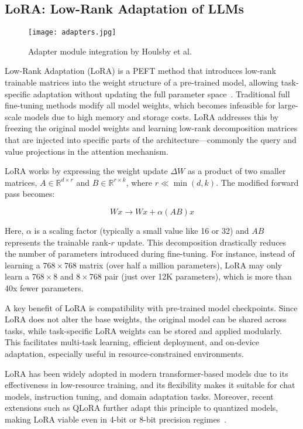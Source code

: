 \subsection{LoRA: Low-Rank Adaptation of LLMs}

\begin{figure}[t]
  \centering
  \texttt{[image: adapters.jpg]}
  \caption{Adapter module integration by Houlsby et al.~\cite{houlsby2019parameter}}
\end{figure}

Low-Rank Adaptation (LoRA) is a PEFT method that introduces low-rank trainable
matrices into the weight structure of a pre-trained model, allowing task-specific adaptation
without updating the full parameter space~\cite{hu2022lora}. Traditional full fine-tuning methods
modify all model weights, which becomes infeasible for large-scale models due to high
memory and storage costs. LoRA addresses this by freezing the original model weights
and learning low-rank decomposition matrices that are injected into specific parts of the
architecture—commonly the query and value projections in the attention mechanism.

LoRA works by expressing the weight update $\Delta W$ as a product of two smaller matrices,
$A \in \mathbb{R}^{d \times r}$ and $B \in \mathbb{R}^{r \times k}$, where $r \ll \min(d, k)$. The modified forward pass becomes:

\begin{equation}
  W x \rightarrow W x + \alpha (AB) x
  \label{lorapass}
\end{equation}

Here, $\alpha$ is a scaling factor (typically a small value like 16 or 32) and $AB$ represents the
trainable rank-$r$ update. This decomposition drastically reduces the number of parameters
introduced during fine-tuning. For instance, instead of learning a $768 \times 768$ matrix (over
half a million parameters), LoRA may only learn a $768 \times 8$ and $8 \times 768$ pair (just over
12K parameters), which is more than 40x fewer parameters.

A key benefit of LoRA is compatibility with pre-trained model checkpoints. Since
LoRA does not alter the base weights, the original model can be shared across tasks,
while task-specific LoRA weights can be stored and applied modularly. This facilitates
multi-task learning, efficient deployment, and on-device adaptation, especially useful in
resource-constrained environments.

LoRA has been widely adopted in modern transformer-based models due to its effectiveness
in low-resource training, and its flexibility makes it suitable for chat models,
instruction tuning, and domain adaptation tasks. Moreover, recent extensions such as
QLoRA further adapt this principle to quantized models, making LoRA viable even in
4-bit or 8-bit precision regimes~\cite{dettmers2023qlora}.

